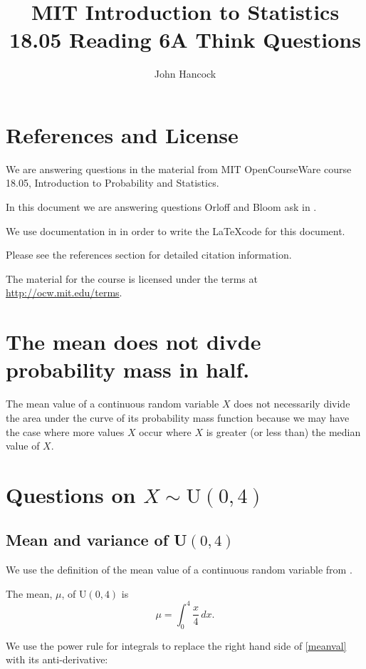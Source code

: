 \documentclass[a4paper,11pt]{article}
\author{John Hancock}
\title{MIT Introduction to Statistics 18.05 Reading 6A Think Questions }
\begin{document}
\maketitle
\tableofcontents
\section{References and License}
We are answering questions in the material from MIT OpenCourseWare
course 18.05, Introduction to Probability and Statistics.

In this document we are answering questions Orloff and Bloom ask in
\cite{reading6aQu}.

We use documentation in \cite{typesetDx} in order to write the \LaTeX code
for this document.

Please see the references section for detailed citation information.

The material for the course is licensed under the terms at
\url{http://ocw.mit.edu/terms}.

\section{The mean does not divde probability mass in half.}
The mean value of a continuous random variable $X$ does not necessarily divide
the area under the curve of its probability mass function because we may
have the case where more values $X$ occur where $X$ is greater (or less than)
the median value of $X$.

\section{Questions on $X \sim \text{U} \left( 0, 4 \right)$}

\subsection{Mean and variance of U$\left(0,4 \right)$}

We use the definition of the mean value of a continuous random variable from
\cite{reading6a}.

The mean, $\mu$, of U$\left( 0,4 \right)$ is
\begin{equation} \label{meanval}
  \mu = \int_0^{4} \frac{x}{4}\,dx.
\end{equation}

We use the power rule for integrals \cite{basicInt} to replace the right hand
side of \ref{meanval} with its anti-derivative:
\end{document}
